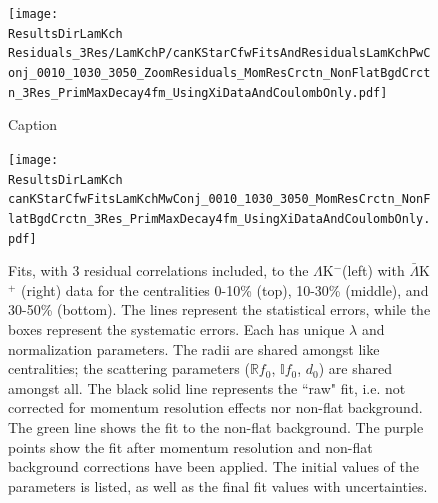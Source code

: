 \documentclass[../AnalysisNoteJBuxton.tex]{subfiles}
\begin{document}
\begin{figure}[h]
  \centering
  \texttt{[image: \\ResultsDirLamKch Residuals\_3Res/LamKchP/canKStarCfwFitsAndResidualsLamKchPwConj\_0010\_1030\_3050\_ZoomResiduals\_MomResCrctn\_NonFlatBgdCrctn\_3Res\_PrimMaxDecay4fm\_UsingXiDataAndCoulombOnly.pdf]}
  \caption[Small Caption]{Caption}
  \label{fig:LamKchPwConjFitsAndResiduals_3Res}
\end{figure}



\begin{figure}[h]
  \centering
  \texttt{[image: \\ResultsDirLamKch canKStarCfwFitsLamKchMwConj\_0010\_1030\_3050\_MomResCrctn\_NonFlatBgdCrctn\_3Res\_PrimMaxDecay4fm\_UsingXiDataAndCoulombOnly.pdf]}
  \caption[$\Lambda$K$^{-}$($\bar{\Lambda}$K$^{+}$) Fits with 3 Residuals]{Fits, with 3 residual correlations included, to the $\Lambda$K$^{-}$(left) with $\bar{\Lambda}$K$^{+}$ (right) data for the centralities 0-10\% (top), 10-30\% (middle), and 30-50\% (bottom).
The lines represent the statistical errors, while the boxes represent the systematic errors.  
Each has unique $\lambda$ and normalization parameters.
The radii are shared amongst like centralities; the scattering parameters ($\mathbb{R}f_{0}$, $\mathbb{I}f_{0}$, $d_{0}$) are shared amongst all.
The black solid line represents the ``raw" fit, i.e. not corrected for momentum resolution effects nor non-flat background.  
The green line shows the fit to the non-flat background.
The purple points show the fit after momentum resolution and non-flat background corrections have been applied.
The initial values of the parameters is listed, as well as the final fit values with uncertainties.}
  \label{fig:LamKchMwConjFits_3Res}
\end{figure}
\end{document}
